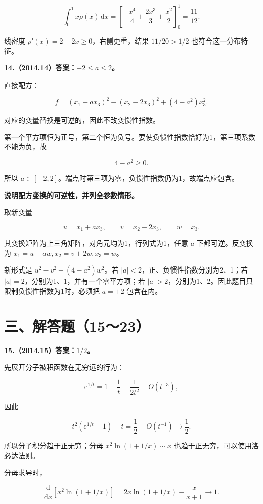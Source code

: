\documentclass[UTF8,11pt,fontset=windows]{ctexart}
\begin{document}
$$
\int_0^1x\rho(x)\,\mathrm dx
=\left[-\frac{x^4}{4}+\frac{2x^3}{3}+\frac{x^2}{2}\right]_0^1
=\frac{11}{12}.
$$

线密度 $\rho'(x)=2-2x\ge0$，右侧更重，结果 $11/20>1/2$ 也符合这一分布特征。

\clearpage

\textbf{14.（2014.14）答案：$-2\le a\le2$。}

直接配方：

$$
f=(x_1+ax_3)^2-(x_2-2x_3)^2+(4-a^2)x_3^2.
$$

对应的变量替换是可逆的，因此不改变惯性指数。

第一个平方项恒为正号，第二个恒为负号。要使负惯性指数恰好为1，第三项系数不能为负，故

$$
4-a^2\ge0.
$$

所以 $a\in[-2,2]$。端点时第三项为零，负惯性指数仍为1，故端点应包含。

\textbf{说明配方变换的可逆性，并列全参数情形。}

取新变量

$$
u=x_1+ax_3,\qquad v=x_2-2x_3,\qquad w=x_3.
$$

其变换矩阵为上三角矩阵，对角元均为1，行列式为1，任意 $a$ 下都可逆。反变换为 $x_1=u-aw,x_2=v+2w,x_3=w$。

新形式是 $u^2-v^2+(4-a^2)w^2$。若 $|a|<2$，正、负惯性指数分别为2、1；若 $|a|=2$，分别为1、1，并有一个零平方项；若 $|a|>2$，分别为1、2。因此题目只限制负惯性指数为1时，必须把 $a=\pm2$ 包含在内。

\clearpage

\section*{三、解答题（15～23）}

\textbf{15.（2014.15）答案：$1/2$。}

先展开分子被积函数在无穷远的行为：

$$
\mathrm e^{1/t}=1+\frac1t+\frac1{2t^2}+O(t^{-3}),
$$

因此

$$
t^2(\mathrm e^{1/t}-1)-t=\frac12+O(t^{-1})\longrightarrow\frac12.
$$

所以分子积分趋于正无穷；分母 $x^2\ln(1+1/x)\sim x$ 也趋于正无穷，可以使用洛必达法则。

分母求导时，

$$
\frac{\mathrm d}{\mathrm dx}\left[x^2\ln(1+1/x)\right]
=2x\ln(1+1/x)-\frac{x}{x+1}\longrightarrow1.
$$
\end{document}
